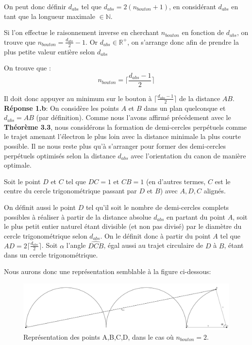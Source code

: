 \documentclass[a4paper]{amsart}
\theoremstyle{definition}
\theoremstyle{remark}
\numberwithin{equation}{section}
\begin{document}
On peut donc définir $d_{abs}$ tel que $d_{abs}=2(n_{bouton}+1)$, en considérant $d_{abs}$ en tant que la longueur maximale $\in\mathbb{N}$.

Si l'on effectue le raisonnement inverse en cherchant $n_{bouton}$ en fonction de $d_{abs}$, on trouve que $n_{bouton}=\frac{d_{abs}}{2}-1$. Or $d_{abs}\in\mathbb{R^+}$, on s'arrange donc afin de prendre la plus petite valeur entière selon $d_{abs}$

On trouve que :
\[n_{bouton}=\lceil \frac{d_{abs}-1}{2} \rceil\]

Il doit donc appuyer au minimum sur le bouton à $\lceil \frac{d_{abs}-1}{2} \rceil$ de la distance $AB$.\\

\textbf{Réponse 1.b}: On considère les points $A$ et $B$ dans un plan quelconque et $d_{abs}=AB$ (par définition). Comme nous l'avons affirmé précédement avec le \textbf{Théorème 3.3}, nous considérons la formation de demi-cercles perpétuels comme le trajet amenant l'électron le plus loin avec la distance minimale la plus courte possible. Il ne nous reste plus qu'à s'arranger pour former des demi-cercles perpétuels optimisés selon la distance $d_{abs}$ avec l'orientation du canon de manière optimale.

Soit le point $D$ et $C$ tel que $DC=1$ et $CB=1$ (en d'autres termes, $C$ est le centre du cercle trigonométrique passant par $D$ et $B$) avec $A,D,C$ alignés.

On définit aussi le point $D$ tel qu'il soit le nombre de demi-cercles complets possibles à réaliser à partir de la distance absolue $d_{abs}$ en partant du point $A$, soit le plus petit entier naturel étant divisible (et non pas divisé) par le diamètre du cercle trigonométrique selon $d_{abs}$. On le définit donc à partir du point $A$ tel que $AD=2\lceil\frac{d_{abs}}{2}\rceil$. Soit $\alpha$ l'angle $\widehat{DCB}$, égal aussi au trajet circulaire de $D$ à $B$, étant dans un cercle trigonométrique.

Nous aurons donc une représentation semblable à la figure ci-dessous:

\begin{figure}[H]
  \centering
  \includegraphics[scale=0.2]{images/dmin.png}
  \caption{Représentation des points A,B,C,D, dans le cas où $n_{bouton}=2$.}
\end{figure}
\end{document}
